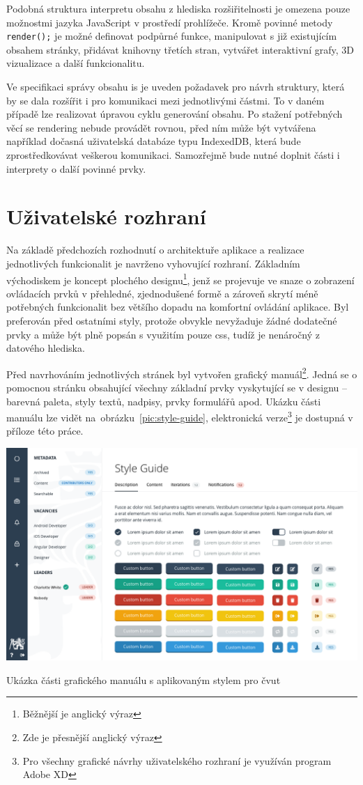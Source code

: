 Podobná struktura interpretu obsahu z hlediska rozšiřitelnosti je omezena pouze možnostmi jazyka JavaScript v prostředí prohlížeče. Kromě povinné metody \texttt{render();} je možné definovat podpůrné funkce, manipulovat s již existujícím obsahem stránky, přidávat knihovny třetích stran, vytvářet interaktivní grafy, 3D vizualizace a další funkcionalitu.

Ve specifikaci správy obsahu \gls{is} je uveden požadavek pro návrh struktury, která by se dala rozšířit i pro komunikaci mezi jednotlivými částmi. To v daném případě lze realizovat úpravou cyklu generování obsahu. Po stažení potřebných věcí se rendering nebude provádět rovnou, před ním může být vytvářena například dočasná uživatelská databáze typu IndexedDB, která bude zprostředkovávat veškerou komunikaci. Samozřejmě bude nutné doplnit části i interprety o další povinné prvky.



\clearpage
\section{Uživatelské rozhraní}

Na základě předchozích rozhodnutí o architektuře aplikace a realizace jednotlivých funkcionalit je navrženo vyhovující rozhraní. Základním východiskem je koncept plochého designu\footnote{Běžnější je anglický výraz }, jenž se projevuje ve snaze o zobrazení ovládacích prvků v přehledné, zjednodušené formě a zároveň skrytí méně potřebných funkcionalit bez většího dopadu na komfortní ovládání aplikace. Byl preferován před ostatními styly, protože obvykle nevyžaduje žádné dodatečné prvky a může být plně popsán s využitím pouze \gls{css}, tudíž je nenáročný z datového hlediska.

Před navrhováním jednotlivých stránek byl vytvořen grafický manuál\footnote{Zde je přesnější anglický výraz }. Jedná se o pomocnou stránku obsahující všechny základní prvky vyskytující se v designu -- barevná paleta, styly textů, nadpisy, prvky formulářů apod. Ukázku části manuálu lze vidět na~obrázku~\ref{pic:style-guide}, elektronická verze\footnote{Pro všechny grafické návrhy uživatelského rozhraní je využíván program Adobe XD} je dostupná v příloze této práce.

\begin{fig:illustration}
   \includegraphics[width=1\textwidth]{images/style-guide.png}
   \caption{Ukázka části grafického manuálu s aplikovaným stylem pro \gls{čvut}}\label{pic:style-guide}
\end{fig:illustration}